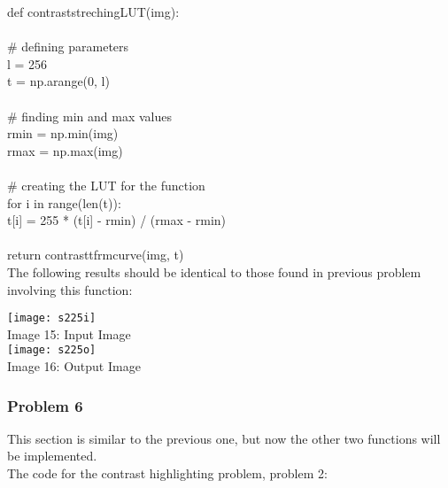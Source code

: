 \documentclass{article}
\begin{document}
	\noindent def contrast\textunderscore streching\textunderscore LUT(img):\\
	\\
	\indent \# defining parameters\\
	\indent l = 256\\
	\indent t = np.arange(0, l)\\
	\\
	\indent \# finding min and max values\\
	\indent r\textunderscore min = np.min(img)\\
	\indent r\textunderscore max = np.max(img)\\
	\\
	\indent \# creating the LUT for the function\\
	\indent for i in range(len(t)):\\
	\indent \indent t[i] = 255 * (t[i] - r\textunderscore min) / (r\textunderscore max - r\textunderscore min)\\
	\\
	\indent return contrast\textunderscore tfrm\textunderscore curve(img, t)\\
	
	The following results should be identical to those found in previous problem involving this function:\\
	
	\begin{center}
		\noindent \texttt{[image: s225i]}\\
		Image 15: Input Image\\
		\texttt{[image: s225o]}\\
		Image 16: Output Image\\
	\end{center}
	
	\subsubsection{Problem 6}
	
	This section is similar to the previous one, but now the other two functions will be implemented.\\
	
	The code for the contrast highlighting problem, problem 2:\\
	
\end{document}
